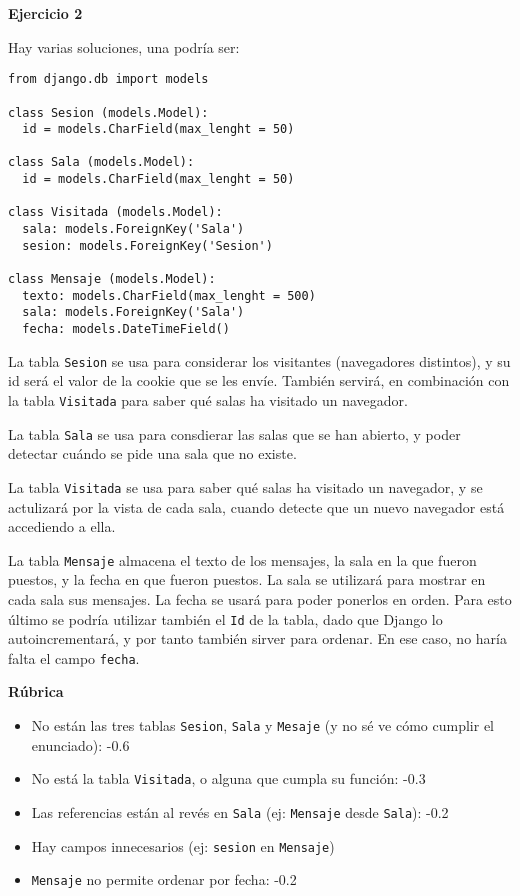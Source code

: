 \textbf{Ejercicio 2}

Hay varias soluciones, una podría ser:

\begin{verbatim}
from django.db import models

class Sesion (models.Model):
  id = models.CharField(max_lenght = 50)

class Sala (models.Model):
  id = models.CharField(max_lenght = 50)

class Visitada (models.Model):
  sala: models.ForeignKey('Sala')
  sesion: models.ForeignKey('Sesion')

class Mensaje (models.Model):
  texto: models.CharField(max_lenght = 500)
  sala: models.ForeignKey('Sala')
  fecha: models.DateTimeField()
\end{verbatim}

La tabla \texttt{Sesion} se usa para considerar los visitantes (navegadores distintos), y su id será el valor de la cookie que se les envíe. También servirá, en combinación con la tabla \texttt{Visitada} para saber qué salas ha visitado un navegador.

La tabla \texttt{Sala} se usa para consdierar las salas que se han abierto, y poder detectar cuándo se pide una sala que no existe.

La tabla \texttt{Visitada} se usa para saber qué salas ha visitado un navegador, y se actulizará por la vista de cada sala, cuando detecte que un nuevo navegador está accediendo a ella.

La tabla \texttt{Mensaje} almacena el texto de los mensajes, la sala en la que fueron puestos, y la fecha en que fueron puestos. La sala se utilizará para mostrar en cada sala sus mensajes. La fecha se usará para poder ponerlos en orden. Para esto último se podría utilizar también el \texttt{Id} de la tabla, dado que Django lo autoincrementará, y por tanto también sirver para ordenar. En ese caso, no haría falta el campo \texttt{fecha}.

\vspace{.4cm}\textbf{Rúbrica}

\begin{itemize}
\item No están las tres tablas \texttt{Sesion}, \texttt{Sala} y \texttt{Mesaje} (y no sé ve cómo cumplir el enunciado): -0.6
\item No está la tabla \texttt{Visitada}, o alguna que cumpla su función: -0.3
\item Las referencias están al revés en \texttt{Sala} (ej: \texttt{Mensaje} desde \texttt{Sala}): -0.2
\item Hay campos innecesarios (ej: \texttt{sesion} en \texttt{Mensaje})
\item \texttt{Mensaje} no permite ordenar por fecha: -0.2
\end{itemize}

